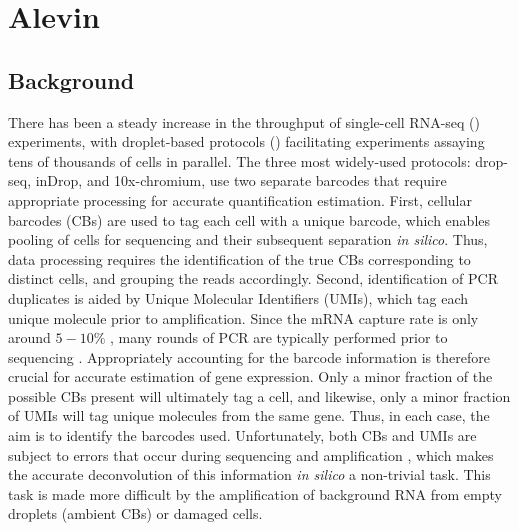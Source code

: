 
\chapter{Alevin ~\citep{Srivastava2019}} %

\label{alevin} %


\newtheorem{theorem}{Theorem}

\section{Background}
There has been a steady increase in the throughput of single-cell RNA-seq (\scrnaseq) experiments, with droplet-based protocols (\dscrnaseq)\citep{dropseq, indrop, tenx} facilitating experiments assaying tens of thousands of cells in parallel. The three most widely-used \dscrnaseq protocols: drop-seq\citep{dropseq}, inDrop\citep{indrop}, and 10x-chromium\citep{tenx}, use two separate barcodes that require appropriate processing for accurate quantification estimation. First, cellular barcodes (CBs) are used to tag each cell with a unique barcode, which enables pooling of cells for sequencing and their subsequent separation \textit{in silico}. Thus, data processing requires the identification of the true CBs corresponding to distinct cells, and grouping the reads accordingly. 
Second, identification of PCR duplicates is aided by Unique Molecular Identifiers (UMIs), which tag each unique molecule prior to amplification. Since the mRNA capture rate is only around $5-10\%$ \citep{power}, many rounds of PCR are typically performed prior to sequencing \citep{dropseq}.
Appropriately accounting for the barcode information is therefore crucial for accurate estimation of gene expression. Only a minor fraction of the possible CBs present will ultimately tag a cell, and likewise, only a minor fraction of UMIs will tag unique molecules from the same gene. Thus, in each case, the aim is to identify the barcodes used. Unfortunately, both CBs and UMIs are subject to errors that occur during sequencing and amplification \citep{umitools, dropseq}, which makes the accurate deconvolution of this information \textit{in silico} a non-trivial task. This task is made more difficult by the amplification of background RNA from empty droplets (ambient CBs) or damaged cells.


